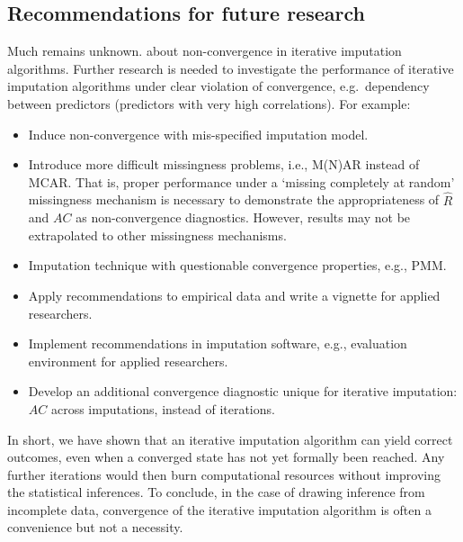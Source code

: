 \documentclass[Royal,times,sageh]{sagej}
\begin{document}
\hypertarget{recommendations-for-future-research}{%
\subsection{Recommendations for future research}\label{recommendations-for-future-research}}

Much remains unknown. about non-convergence in iterative imputation algorithms. Further research is needed to investigate the performance of iterative imputation algorithms under clear violation of convergence, e.g.~dependency between predictors (predictors with very high correlations). For example:

\begin{itemize}
\item
  Induce non-convergence with mis-specified imputation model.
\item
  Introduce more difficult missingness problems, i.e., M(N)AR instead of MCAR. That is, proper performance under a `missing completely at random' missingness mechanism is necessary to demonstrate the appropriateness of \(\widehat{R}\) and \(AC\) as non-convergence diagnostics. However, results may not be extrapolated to other missingness mechanisms.
\item
  Imputation technique with questionable convergence properties, e.g., PMM.
\item
  Apply recommendations to empirical data and write a vignette for applied researchers.
\item
  Implement recommendations in imputation software, e.g., evaluation environment for applied researchers.
\item
  Develop an additional convergence diagnostic unique for iterative imputation: \(AC\) across imputations, instead of iterations.
\end{itemize}

In short, we have shown that an iterative imputation algorithm can yield correct outcomes, even when a converged state has not yet formally been reached. Any further iterations would then burn computational resources without improving the statistical inferences. To conclude, in the case of drawing inference from incomplete data, convergence of the iterative imputation algorithm is often a convenience but not a necessity.



\end{document}
